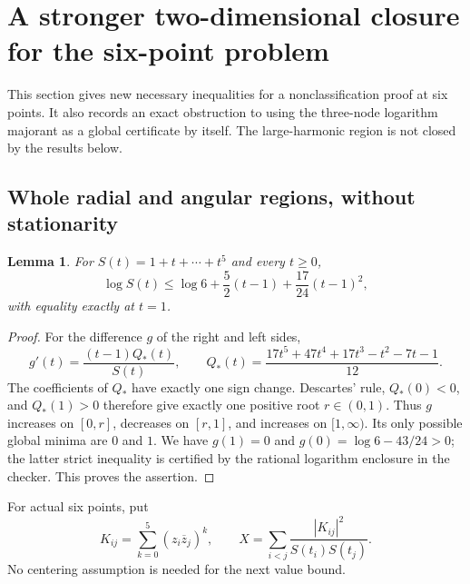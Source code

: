 \documentclass[11pt]{article}
\newtheorem{lemma}[theorem]{Lemma}
\theoremstyle{remark}
\numberwithin{equation}{section}
\begin{document}
\section{A stronger two-dimensional closure for the six-point problem}
\label{sec:noorigin-oct7-six}

This section gives new necessary inequalities for a nonclassification
proof at six points. It also records an exact obstruction to using the
three-node logarithm majorant as a global certificate by itself. The
large-harmonic region is not closed by the results below.

\subsection{Whole radial and angular regions, without stationarity}

\begin{lemma}\label{lem:noorigin-six-radial-majorant}
For $S(t)=1+t+\cdots+t^5$ and every $t\ge0$,
\[
 \log S(t)\le\log6+\frac52(t-1)+\frac{17}{24}(t-1)^2,
\]
with equality exactly at $t=1$.
\end{lemma}
\begin{proof}
For the difference $g$ of the right and left sides,
\[
 g'(t)=\frac{(t-1)Q_*(t)}{S(t)},\qquad
 Q_*(t)=\frac{17t^5+47t^4+17t^3-t^2-7t-1}{12}.
\]
The coefficients of $Q_*$ have exactly one sign change.
Descartes' rule, $Q_*(0)<0$, and $Q_*(1)>0$ therefore give
exactly one positive root $r\in(0,1)$. Thus $g$ increases on
$[0,r]$, decreases on $[r,1]$, and increases on $[1,\infty)$.
Its only possible global minima are $0$ and $1$.
We have $g(1)=0$ and $g(0)=\log6-43/24>0$; the latter strict
inequality is certified by the rational logarithm enclosure in the
checker. This proves the assertion.
\end{proof}

For actual six points, put
\[
 K_{ij}=\sum_{k=0}^5(z_i\overline z_j)^k,
 \qquad X=\sum_{i<j}\frac{|K_{ij}|^2}{S(t_i)S(t_j)}.
\]
No centering assumption is needed for the next value bound.
\end{document}
